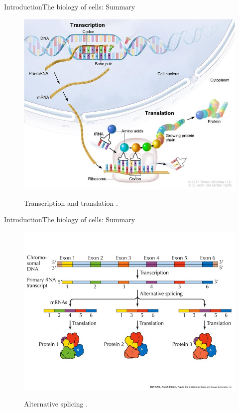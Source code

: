 \documentclass[10pt]{beamer}
\begin{document}
{%
\begin{frame}{Introduction}{The biology of cells: Summary}
\begin{figure}[]
 \centering
    \includegraphics[width=\textwidth,height=0.7\textheight,keepaspectratio]{img/numbers/trans.jpg}
    \label{img:mot2}
    \caption{Transcription and translation \cite{nci2020}.}
\end{figure}
\end{frame}

\begin{frame}{Introduction}{The biology of cells: Summary}
\begin{figure}[]
 \centering
    \includegraphics[width=\textwidth,height=0.7\textheight,keepaspectratio]{img/numbers/alt.jpg}
    \label{img:mot2}
    \caption{Alternative splicing \cite{genbio2020}.}
\end{figure}
\end{frame}


}
\end{document}
